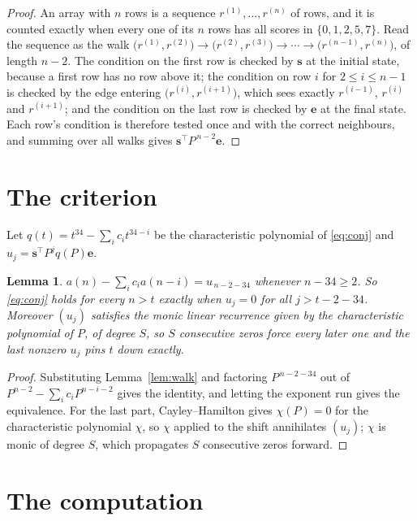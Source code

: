 \documentclass[11pt,a4paper]{article}
\theoremstyle{plain}
\newtheorem{lemma}[theorem]{Lemma}
\theoremstyle{definition}
\begin{document}
\begin{proof}
An array with $n$ rows is a sequence $r^{(1)},\dots,r^{(n)}$ of rows, and it is counted
exactly when every one of its $n$ rows has all scores in $\{0,1,2,5,7\}$. Read the sequence as the
walk $\bigl(r^{(1)},r^{(2)}\bigr)\to\bigl(r^{(2)},r^{(3)}\bigr)\to\cdots\to
\bigl(r^{(n-1)},r^{(n)}\bigr)$, of length $n-2$. The condition on the first row is
checked by $\mathbf{s}$ at the initial state, because a first row has no row above it; the
condition on row $i$ for $2\le i\le n-1$ is checked by the edge entering
$\bigl(r^{(i)},r^{(i+1)}\bigr)$, which sees exactly $r^{(i-1)}$, $r^{(i)}$ and
$r^{(i+1)}$; and the condition on the last row is checked by $\mathbf{e}$ at the final
state. Each row's condition is therefore tested once and with the correct neighbours, and
summing over all walks gives $\mathbf{s}^{\!\top}P^{\,n-2}\mathbf{e}$.
\end{proof}

\section{The criterion}

Let $q(t)=t^{34}-\sum_i c_i t^{34-i}$ be the characteristic polynomial of
\eqref{eq:conj} and $u_j=\mathbf{s}^{\!\top}P^{j}q(P)\mathbf{e}$.

\begin{lemma}\label{lem:crit}
$a(n)-\sum_i c_i a(n-i)=u_{\,n-2-34}$ whenever $n-34\ge2$. So \eqref{eq:conj}
holds for every $n>t$ exactly when $u_j=0$ for all $j>t-2-34$. Moreover $(u_j)$
satisfies the monic linear recurrence given by the characteristic polynomial of $P$, of
degree $S$, so $S$ consecutive zeros force every later one and the last nonzero $u_j$ pins
$t$ down exactly.
\end{lemma}

\begin{proof}
Substituting Lemma~\ref{lem:walk} and factoring $P^{\,n-2-34}$ out of
$P^{n-2}-\sum_i c_i P^{n-i-2}$ gives the identity, and letting the exponent run gives the
equivalence. For the last part, Cayley--Hamilton gives $\chi(P)=0$ for the characteristic
polynomial $\chi$, so $\chi$ applied to the shift annihilates $(u_j)$; $\chi$ is monic of
degree $S$, which propagates $S$ consecutive zeros forward.
\end{proof}

\section{The computation}
\end{document}
